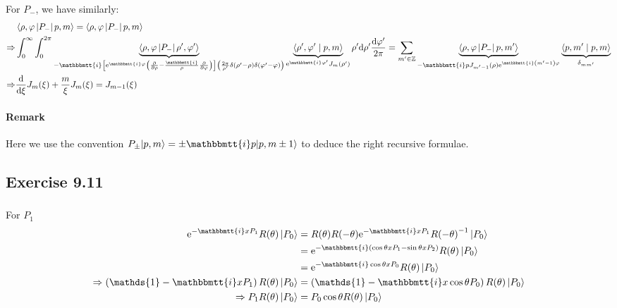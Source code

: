 \documentclass[]{ctexart}
\newcommand{\mi}{\mathbbmtt{i}}
\newcommand{\di}{\mathrm{d}}
\newcommand{\me}{\mathrm{e}}
\begin{document}
	For $P_-$, we have similarly:
		\begin{equation*}
		\begin{aligned}
			&\left\langle \rho, \varphi\left|P_{-}\right| p, m\right\rangle=\left\langle \rho, \varphi\left|P_{-}\right| p, m\right\rangle\\
			\Rightarrow &\int_{0}^{\infty} \int_{0}^{2 \pi}\underbrace{\left\langle \rho, \varphi\left|P_{-}\right| \rho^{\prime}, \varphi^{\prime}\right\rangle}_{-\mi\left[\me^{\mi \varphi}\left(\frac{\partial}{\partial \rho}-\frac{\mi}{\rho} \frac{\partial}{\partial \varphi}\right)\right]\left(\frac{2 \pi}{\rho^{\prime}} \delta\left(\rho^{\prime}-\rho\right) \delta\left(\varphi^{\prime}-\varphi\right)\right)}\underbrace{\left\langle\rho^{\prime}, \varphi^{\prime} \mid p, m\right\rangle}_{\me^{\mi \varphi'}J_m(\rho')} \rho^{\prime} \di \rho^{\prime} \frac{\di \varphi^{\prime}}{2 \pi}=\sum_{m^{\prime} \in \mathbb{Z}}\underbrace{\left\langle \rho, \varphi\left|P_{-}\right| p, m^{\prime}\right\rangle}_{-\mi p J_{m^{\prime}-1}(\rho) \me^{\mi\left(m^{\prime}-1\right) \varphi}}\underbrace{\left\langle p, m^{\prime} \mid p,m\right\rangle}_{\delta_{mm'}}\\
			\Rightarrow &\frac{\di}{\di \xi} J_{m}(\xi)+\frac{m}{\xi} J_{m}(\xi)=J_{m-1}(\xi)
		\end{aligned}
		\end{equation*}
	
	\paragraph{Remark } Here we use the convention $P_{\pm}|p,m\rangle=\pm\mi p|p,m\pm 1\rangle$ to deduce the right recursive formulae. 
	
\subsection{Exercise 9.11}
	\subsubsection{}
		For $P_1$
			\begin{equation*}
			\begin{aligned}
				\me^{-\mi x P_{1}} R(\theta)\left|P_{0}\right\rangle&=R(\theta) R(-\theta) \me^{-\mi x P_{1}} R{(-\theta)}^{-1}\left|P_{0}\right\rangle\\
				&=\me^{-\mi\left(\cos \theta x P_{1}-\sin \theta x P_{2}\right)}R(\theta)\left|P_{0}\right\rangle\\
				&=\me^{-\mi \cos \theta x P_{0}} R(\theta)\left|P_{0}\right\rangle\\
				\Rightarrow\left(\mathds{1}-\mi x P_{1}\right) R(\theta)\left|P_{0}\right\rangle&=\left(\mathds{1}-\mi x \cos \theta P_{0}\right) R(\theta)\left|P_{0}\right\rangle\\
				\Rightarrow P_{1} R(\theta)\left|P_{0}\right\rangle&=P_{0} \cos \theta R(\theta)\left|P_{0}\right\rangle
			\end{aligned}
			\end{equation*}
			
\end{document}
